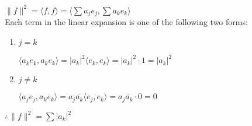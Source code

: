 \documentclass[letterpaper,12pt,fleqn]{article}
\newcommand{\abs}[1]{\left|#1\right|}
\newcommand{\norm}[1]{\lVert#1\rVert}
\newcommand{\inner}[2]{\langle#1,#2\rangle}
\newcommand{\Conj}[1]{\overline{#1}}
\begin{document}
\begin{theproof}
$\norm{f}^2=\inner{f}{f}=\inner{\sum a_je_j}{\sum a_ke_k}$ \\

Each term in the linear expansion is one of the following two forms:
\begin{enumerate}
\item{$j=k$}

$\inner{a_ke_k}{a_ke_k}=\abs{a_k}^2\inner{e_k}{e_k}=\abs{a_k}^2\cdot1=\abs{a_k}^2$

\item{$j\ne k$}

$\inner{a_je_j}{a_ke_k}=a_j\Conj{a_k}\inner{e_j}{e_k}=a_j\Conj{a_k}\cdot0=0$
\end{enumerate}

$\therefore \norm{f}^2=\sum\abs{a_k}^2$
\end{theproof}
\end{document}

